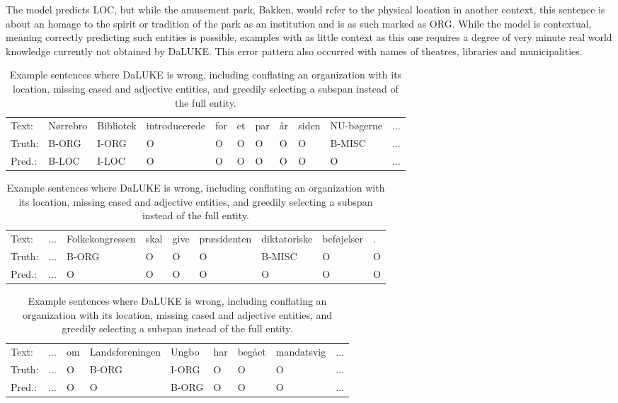 \documentclass[main.tex]{subfiles}
\begin{document}
The model predicts LOC, but while the amusement park, Bakken, would refer to the physical location in another context, this sentence is about an homage to the spirit or tradition of the park as an institution and is as such marked as ORG.
While the model is contextual, meaning correctly predicting such entities is possible, examples with as little context as this one requires a degree of very minute real world knowledge currently not obtained by DaLUKE.
This error pattern also occurred with names of theatres, libraries and municipalities.
\begin{table}[H]
    \footnotesize
    \begin{tabular}{l|llllllllll}
        Text:   & Nørrebro  & Bibliotek  & introducerede  &for  &et  &par  &år  &siden  &NU-bøgerne & $\ldots$ \\
        Truth:  & B-ORG     & I-ORG      & O              &O    &O   &O    &O   &O      &B-MISC  & $\ldots$    \\
        Pred.:   & B-LOC     & I-LOC      & O              &O    &O   &O    &O   &O      &O   & $\ldots$\\\hline
    \end{tabular}\par
    \begin{tabular}{l|llllllll}
        Text:    & $\ldots$  &Folkekongressen  &skal  &give  &præsidenten  &diktatoriske  &beføjelser  &.\\
        Truth:   & $\ldots$  &B-ORG            &O     &O     &O            &B-MISC        &O           &O\\
        Pred.:   & $\ldots$  &O                &O     &O     &O            &O             &O           &O\\\hline
    \end{tabular}\par
    \begin{tabular}{l|llllllll}
        Text:    & $\ldots$ &  om  &Landsforeningen  &Ungbo  &har  &begået  &mandatsvig  & $\ldots$ \\
        Truth:   & $\ldots$ &  O   &B-ORG            &I-ORG  &O    &O       &O           & $\ldots$ \\
        Pred.:   & $\ldots$ &  O   &O                &B-ORG  &O    &O       &O           & $\ldots$
    \end{tabular}
    \caption{
        Example sentences where DaLUKE is wrong, including conflating an organization with its location, missing cased and adjective entities, and greedily selecting a subspan instead of the full entity.
    }
    \label{tab:dalukeerrors}
\end{table}\noindent
\end{document}
